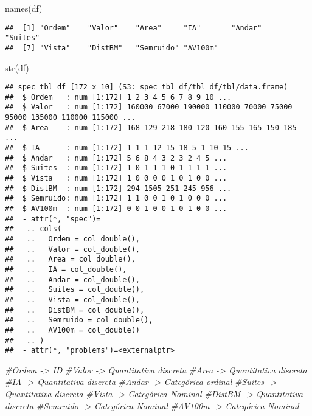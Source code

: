 \documentclass[
]{article}
\newenvironment{Shaded}{\begin{snugshade}}{\end{snugshade}}
\newcommand{\CommentTok}[1]{\textcolor[rgb]{0.56,0.35,0.01}{\textit{#1}}}
\newcommand{\FunctionTok}[1]{\textcolor[rgb]{0.00,0.00,0.00}{#1}}
\newcommand{\NormalTok}[1]{#1}
\begin{document}
\begin{Shaded}
\begin{Highlighting}[]
\FunctionTok{names}\NormalTok{(df)}
\end{Highlighting}
\end{Shaded}

\begin{verbatim}
##  [1] "Ordem"    "Valor"    "Area"     "IA"       "Andar"    "Suites"  
##  [7] "Vista"    "DistBM"   "Semruido" "AV100m"
\end{verbatim}

\begin{Shaded}
\begin{Highlighting}[]
\FunctionTok{str}\NormalTok{(df)}
\end{Highlighting}
\end{Shaded}

\begin{verbatim}
## spec_tbl_df [172 x 10] (S3: spec_tbl_df/tbl_df/tbl/data.frame)
##  $ Ordem   : num [1:172] 1 2 3 4 5 6 7 8 9 10 ...
##  $ Valor   : num [1:172] 160000 67000 190000 110000 70000 75000 95000 135000 110000 115000 ...
##  $ Area    : num [1:172] 168 129 218 180 120 160 155 165 150 185 ...
##  $ IA      : num [1:172] 1 1 1 12 15 18 5 1 10 15 ...
##  $ Andar   : num [1:172] 5 6 8 4 3 2 3 2 4 5 ...
##  $ Suites  : num [1:172] 1 0 1 1 1 0 1 1 1 1 ...
##  $ Vista   : num [1:172] 1 0 0 0 0 1 0 1 0 0 ...
##  $ DistBM  : num [1:172] 294 1505 251 245 956 ...
##  $ Semruido: num [1:172] 1 1 0 0 1 0 1 0 0 0 ...
##  $ AV100m  : num [1:172] 0 0 1 0 0 1 0 1 0 0 ...
##  - attr(*, "spec")=
##   .. cols(
##   ..   Ordem = col_double(),
##   ..   Valor = col_double(),
##   ..   Area = col_double(),
##   ..   IA = col_double(),
##   ..   Andar = col_double(),
##   ..   Suites = col_double(),
##   ..   Vista = col_double(),
##   ..   DistBM = col_double(),
##   ..   Semruido = col_double(),
##   ..   AV100m = col_double()
##   .. )
##  - attr(*, "problems")=<externalptr>
\end{verbatim}

\begin{Shaded}
\begin{Highlighting}[]
\CommentTok{\#Ordem {-}\textgreater{} ID}
\CommentTok{\#Valor {-}\textgreater{} Quantitativa discreta}
\CommentTok{\#Area {-}\textgreater{} Quantitativa discreta}
\CommentTok{\#IA {-}\textgreater{} Quantitativa discreta}
\CommentTok{\#Andar {-}\textgreater{} Categórica ordinal}
\CommentTok{\#Suites {-}\textgreater{}  Quantitativa discreta}
\CommentTok{\#Vista {-}\textgreater{} Categórica Nominal}
\CommentTok{\#DistBM {-}\textgreater{} Quantitativa discreta}
\CommentTok{\#Semruido {-}\textgreater{} Categórica Nominal}
\CommentTok{\#AV100m {-}\textgreater{} Categórica Nominal }
\end{Highlighting}
\end{Shaded}
\end{document}
